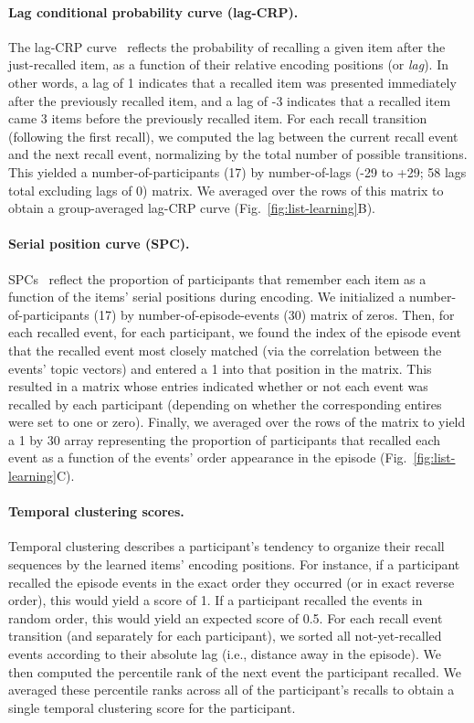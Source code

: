 \documentclass[10pt]{article}
\begin{document}
\paragraph{Lag conditional probability curve (lag-CRP).} The lag-CRP curve~\citep{Kaha96} reflects the probability of recalling a given item after the just-recalled item, as a function of their relative encoding positions (or \textit{lag}).  In other words, a lag of 1 indicates that a recalled item was presented immediately after the previously recalled item, and a lag of -3 indicates that a recalled item came 3 items before the previously recalled item.  For each recall transition (following the first recall), we computed the lag between the current recall event and the next recall event, normalizing by the total number of possible transitions.  This yielded a number-of-participants (17) by number-of-lags (-29 to +29; 58 lags total excluding lags of 0) matrix. We averaged over the rows of this matrix to obtain a group-averaged lag-CRP curve (Fig.~\ref{fig:list-learning}B).

\paragraph{Serial position curve (SPC).} SPCs~\citep{Murd62a} reflect the proportion of participants that remember each item as a function of the items' serial positions during encoding. We initialized a number-of-participants (17) by number-of-episode-events (30) matrix of zeros. Then, for each recalled event, for each participant, we found the index of the episode event that the recalled event most closely matched (via the correlation between the events' topic vectors) and entered a 1 into that position in the matrix. This resulted in a matrix whose entries indicated whether or not each event was recalled by each participant (depending on whether the corresponding entires were set to one or zero).  Finally, we averaged over the rows of the matrix to yield a 1 by 30 array representing the proportion of participants that recalled each event as a function of the events' order appearance in the episode (Fig.~\ref{fig:list-learning}C).

\paragraph{Temporal clustering scores.} Temporal clustering describes a participant's tendency to organize their recall sequences by the learned items' encoding positions.  For instance, if a participant recalled the episode events in the exact order they occurred (or in exact reverse order), this would yield a score of 1.  If a participant recalled the events in random order, this would yield an expected score of 0.5.  For each recall event transition (and separately for each participant), we sorted all not-yet-recalled events according to their absolute lag (i.e., distance away in the episode).  We then computed the percentile rank of the next event the participant recalled.  We averaged these percentile ranks across all of the participant's recalls to obtain a single temporal clustering score for the participant.
\end{document}
